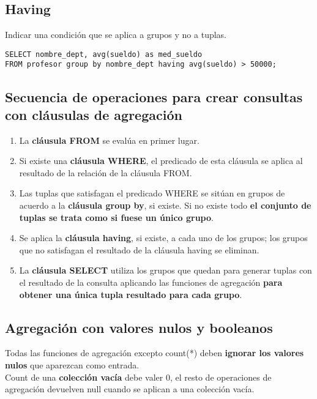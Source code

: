 \documentclass{article}
\begin{document}
\subsection{Having}
Indicar una condición que se aplica a grupos y no a tuplas.
\begin{verbatim}
SELECT nombre_dept, avg(sueldo) as med_sueldo
FROM profesor group by nombre_dept having avg(sueldo) > 50000;
\end{verbatim}

\subsection{Secuencia de operaciones para crear consultas con cláusulas de agregación}
\begin{enumerate}
    \item La \textbf{cláusula FROM} se evalúa en primer lugar.

    \item Si existe una \textbf{cláusula WHERE}, el predicado de esta cláusula se aplica al resultado de la relación de la cláusula FROM.

    \item Las tuplas que satisfagan el predicado WHERE se sitúan en grupos de acuerdo a la \textbf{cláusula group by}, si existe. Si no existe todo \textbf{el conjunto de tuplas se trata como si fuese un único grupo}.

    \item Se aplica la \textbf{cláusula having}, si existe, a cada uno de los grupos; los grupos que no satisfagan el resultado de la cláusula having se eliminan.

    \item La \textbf{cláusula SELECT} utiliza los grupos que quedan para generar tuplas con el resultado de la consulta aplicando las funciones de agregación \textbf{para obtener una única tupla resultado para cada grupo}.
\end{enumerate}

\subsection{Agregación con valores nulos y booleanos}
Todas las funciones de agregación excepto count(*) deben \textbf{ignorar los valores nulos} que aparezcan como entrada. \\
Count de una \textbf{colección vacía} debe valer 0, el resto de operaciones de agregación devuelven null cuando se aplican a una colección vacía.
\end{document}
